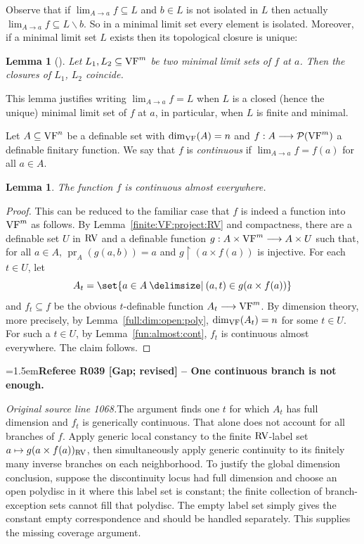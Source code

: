 \documentclass[12pt]{amsart}
\newcommand{\RefereeRemark}[4]{%
  \par\medskip\begingroup\normalfont\small\color{RefereePurple}%
  \emergencystretch=1.5em\noindent\textbf{Referee R#1 [#2] -- #3.}\par\nobreak\noindent #4\par
  \endgroup\medskip
}
\newcommand{\memph}[1]{{\color{magenta}\emph{#1}}}
\theoremstyle{plain}
\newtheorem{lem}[thm]{Lemma}
\theoremstyle{definition}
\theoremstyle{remark}
\numberwithin{equation}{section}
\theoremstyle{plain}
\newcommand{\VF}{\textup{VF}}
\newcommand{\RV}{\textup{RV}}
\DeclareMathOperator{\pr}{pr}
\newcommand{\0}{\emptyset}
\newcommand{\mdl}[1]{\mathcal{#1}}  %
\newcommand{\rest}{\upharpoonright}
\newcommand{\fun}{\longrightarrow}
\newcommand{\sub}{\subseteq}
\newcommand{\mi}{\smallsetminus}
\providecommand\given{}
\newcommand\SetSymbol[1][]{%
\nonscript \: #1 \vert
\allowbreak
\nonscript\:
\mathopen{}}
\renewcommand\given{\SetSymbol[\delimsize]}
\begin{document}
Observe that if $\lim_{A \rightarrow a} f \sub L$ and $b \in L$ is not isolated in $L$ then actually $\lim_{ A \rightarrow  a} f \sub L \mi b$. So in a minimal limit set every element is isolated. Moreover, if a minimal limit set $L$ exists then its topological closure is unique:

\begin{lem}[{\cite[Lemma~9.2]{Yin:special:trans}}]
Let $L_1, L_2 \sub \VF^m$ be two minimal limit sets of $f$ at $a$. Then the closures of $L_1$, $L_2$ coincide.
\end{lem}


This lemma justifies writing $\lim_{ A \rightarrow a} f = L$ when $L$ is a closed (hence the unique) minimal limit set of $f$ at $a$, in particular, when $L$ is finite and minimal.

Let $A \sub \VF^n$ be a definable set with $\dim_{\VF}(A) = n$ and $f : A \fun \mdl P(\VF^m)$ a definable finitary function. We say that $f$ is \memph{continuous} if $\lim_{ A \rightarrow a} f = f(a)$ for all $a \in A$.

\begin{lem}\label{fini:conti}
The function $f$ is continuous almost everywhere.
\end{lem}
\begin{proof}
This can be reduced to the familiar case that $f$ is indeed a function into $\VF^m$ as follows. By Lemma~\ref{finite:VF:project:RV} and compactness, there are a definable set $U$ in $\RV$ and a definable function $g: A \times \VF^m \fun A \times U$ such that, for all $a \in A$, $\pr_A(g(a, b)) = a$  and $g \rest (a \times f(a))$ is injective. For each $t \in U$, let
\[
A_t = \set{a \in A \given (a,t) \in g(a \times f(a))}
\]
and $f_t \sub f$ be the obvious $t$-definable function $A_t \fun \VF^m$. By dimension theory, more precisely, by Lemma~\ref{full:dim:open:poly}, $\dim_{\VF}(A_t) = n$ for some $t \in U$. For such a $t \in U$, by Lemma~\ref{fun:almost:cont}, $f_t$ is continuous almost everywhere.  The claim follows.
\end{proof}

\RefereeRemark{039}{Gap; revised}{One continuous branch is not enough}{%
\textit{Original source line 1068.}\quad The argument finds one $t$ for which $A_t$ has full dimension and $f_t$ is generically continuous. That alone does not account for all branches of $f$. Apply generic local constancy to the finite $\RV$-label set $a\mapsto g(a\times f(a))_{\RV}$, then simultaneously apply generic continuity to its finitely many inverse branches on each neighborhood. To justify the global dimension conclusion, suppose the discontinuity locus had full dimension and choose an open polydisc in it where this label set is constant; the finite collection of branch-exception sets cannot fill that polydisc. The empty label set simply gives the constant empty correspondence and should be handled separately. This supplies the missing coverage argument.
}
\end{document}
